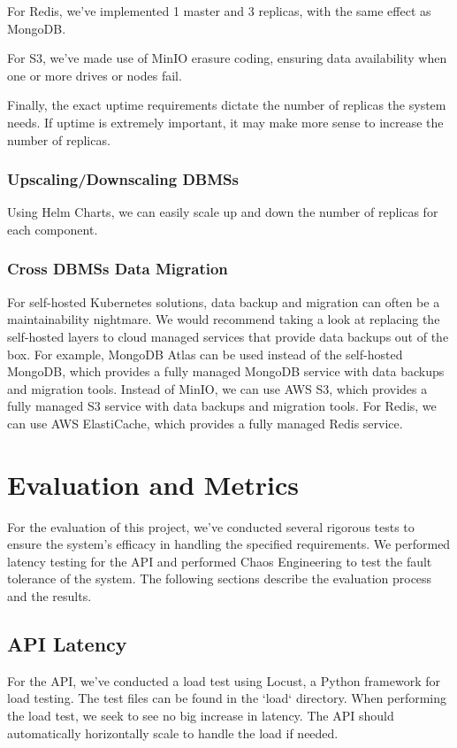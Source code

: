\documentclass{report}
\begin{document}
    For Redis, we've implemented 1 master and 3 replicas, with the same effect as MongoDB.

    For S3, we've made use of MinIO erasure coding, ensuring data availability when one or more drives or nodes fail.

    Finally, the exact uptime requirements dictate the number of replicas the system needs. If uptime is extremely important, it may make more sense to increase the number of replicas.

    \subsubsection{Upscaling/Downscaling DBMSs}

    Using Helm Charts, we can easily scale up and down the number of replicas for each component.

    \subsubsection{Cross DBMSs Data Migration}
    For self-hosted Kubernetes solutions, data backup and migration can often be a maintainability nightmare. We would recommend taking a look at replacing the self-hosted layers to cloud managed services that provide data backups out of the box. For example, MongoDB Atlas can be used instead of the self-hosted MongoDB, which provides a fully managed MongoDB service with data backups and migration tools. Instead of MinIO, we can use AWS S3, which provides a fully managed S3 service with data backups and migration tools. For Redis, we can use AWS ElastiCache, which provides a fully managed Redis service.

    \section{Evaluation and Metrics}
    For the evaluation of this project, we've conducted several rigorous tests to ensure the system's efficacy in handling the specified requirements. We performed latency testing for the API and performed Chaos Engineering to test the fault tolerance of the system. The following sections describe the evaluation process and the results.

    \subsection{API Latency}
    For the API, we've conducted a load test using Locust, a Python framework for load testing. The test files can be found in the `load` directory. When performing the load test, we seek to see no big increase in latency. The API should automatically horizontally scale to handle the load if needed.
\end{document}
